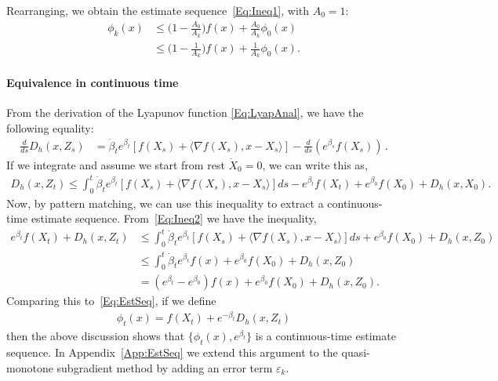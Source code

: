 \documentclass[11pt]{article}
\theoremstyle{plain}
\begin{document}
Rearranging, we obtain the estimate sequence~\eqref{Eq:Ineq1}, with $A_0 = 1$:
\begin{subequations}
\begin{align}
\phi_k(x) &\leq \Big(1 -\frac{A_0}{A_k}\Big) f(x) + \frac{A_0}{A_k} \phi_0(x) \\
&\leq \Big(1 - \frac{1}{A_k}\Big)f(x) + \frac{1}{A_k}\phi_0(x).
\end{align}
\end{subequations}
\paragraph{Equivalence in continuous time}
From the derivation of the Lyapunov function \eqref{Eq:LyapAnal}, we have the following equality:
\begin{align*}
\frac{d}{ds}D_h\left(x, Z_s\right)  &= \dot \beta_t e^{\beta_t}  [f(X_s)+ \langle \nabla f(X_s), x - X_s \rangle] -  \frac{d}{ds}\left( e^{ \beta_s}  f(X_s)\right)\,.
\end{align*}
If we integrate and assume we start from rest $\dot X_0 = 0$, we can write this as,
\begin{align}\label{Eq:Ineq2}
 D_h(x, Z_t) \leq \int_0^t\dot \beta_t e^{\beta_t} [f(X_s)+ \langle \nabla f(X_s), x - X_s \rangle]ds  -  e^{ \beta_t}  f(X_t) + e^{\beta_0} f(X_0) + D_h(x, X_0).
\end{align}
Now, by pattern matching, we can use this inequality to extract a continuous-time estimate sequence. 
From~\eqref{Eq:Ineq2} we have the inequality,
\begin{align*}
e^{\beta_t}f(X_t) + D_h(x, Z_t) &\leq \int_0^t\dot \beta_t e^{\beta_t}  [f(X_s)+ \langle \nabla f(X_s), x - X_s \rangle]ds + e^{\beta_0}f(X_0)+  D_h(x,Z_0)\\
&\leq \int_0^t \dot \beta_t e^{\beta_t}f(x) + e^{\beta_0}f(X_0)+  D_h(x,Z_0)\\
 &= (e^{\beta_t} - e^{\beta_0}) f(x) + e^{\beta_0}f(X_0)+  D_h(x,Z_0).
\end{align*}
Comparing this to~\eqref{Eq:EstSeq}, if we define
\begin{align*}
\phi_t(x)=f(X_t) + e^{-\beta_t}D_h(x, Z_t)
\end{align*}
then the above discussion shows that $\{\phi_t(x), e^{\beta_t}\}$ is a continuous-time estimate sequence. In Appendix~\ref{App:EstSeq} we extend this argument to the quasi-monotone subgradient method by adding an error term $\varepsilon_k$. 
\end{document}
